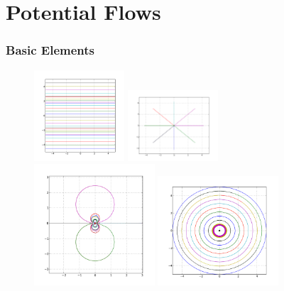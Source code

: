 \documentclass{beamer}
\begin{document}
\section{Potential Flows}
\begin{frame}
	\frametitle{Basic Elements}
	\begin{figure}
		\centering
		\includegraphics[width=0.3\textwidth]{Images/uniform.pdf}
		\includegraphics[width=0.3\textwidth]{Images/source.pdf}\\
		\includegraphics[width=0.4\textwidth]{Images/doublet.pdf}
		\includegraphics[width=0.4\textwidth]{Images/vortex.pdf}
	\end{figure}
\end{frame}
\end{document}
